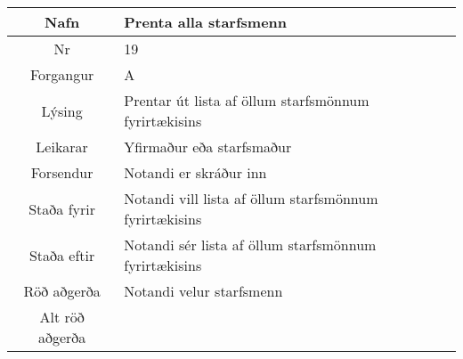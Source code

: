 \documentclass[a4paper]{article}
\begin{document}
\begin{tabular}{|c|p{10cm}|}
\hline
Nafn&Prenta alla starfsmenn\\
\hline
Nr&19\\
\hline
Forgangur&A\\
\hline
Lýsing&Prentar út lista af öllum starfsmönnum fyrirtækisins\\
\hline
Leikarar&Yfirmaður eða starfsmaður\\
\hline
Forsendur&Notandi er skráður inn\\
\hline
Staða fyrir&Notandi vill lista af öllum starfsmönnum fyrirtækisins\\
\hline
Staða eftir&Notandi sér lista af öllum starfsmönnum fyrirtækisins\\
\hline
Röð aðgerða&Notandi velur starfsmenn\\
\hline
Alt röð aðgerða&\\
\hline
\end{tabular}
\end{document}

